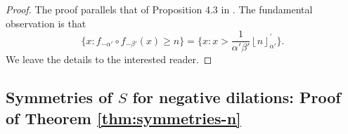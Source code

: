 \documentclass[11pt, letterpaper, reqno]{amsart}
\theoremstyle{definition}
\theoremstyle{remark}
\numberwithin{equation}{section}
\newcommand{\ZZ}{\ensuremath{\mathbb{Z}}}
\newcommand{\floor}[1]{\lfloor{#1}\rfloor}
\newcommand{\bfloor}[1]{\left\lfloor{#1}\right\rfloor}
\newcommand{\ceil}[1]{\lceil{#1}\rceil}
\newcommand{\bceil}[1]{\left\lceil{#1}\right\rceil}
\newcommand{\sfloor}[1]{\left\lfloor{#1}\right\rfloor^{'}}
\newcommand{\sceil}[1]{\left\lceil{#1}\right\rceil^{'}}
\newcommand{\alphap}{{\alpha'}}
\newcommand{\betap}{{\beta'}}
\begin{document}
\begin{proof}
The  proof parallels that of Proposition 4.3 in  \cite[p. 284]{LagR:2018a}.
The fundamental observation is that
\begin{equation}
\label{eqn:level3}
\{x:  f_{-\alphap}\circ f_{-\betap}(x) \ge n\}
 = \{ x : x > \frac1{\alphap\betap} \sfloor{n}_{\alphap} \}  .
\end{equation}
We leave the details to the interested reader.
\end{proof}


%
%
\subsection{Symmetries of $S$ for negative dilations: Proof of Theorem \ref{thm:symmetries-n}} \label{subsec:symmetries-third}
\end{document}
